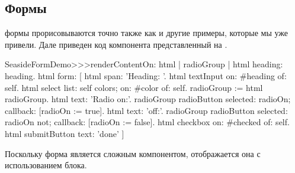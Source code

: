 \documentclass[a4paper,10pt,twoside]{book}
\begin{document}
\subsection{Формы}


формы прорисовываются точно также как и другие примеры,
которые мы уже привели.
Дале приведен код компонента  представленный на
.

\begin{code}{}
SeasideFormDemo>>>renderContentOn: html
	| radioGroup |
	html heading: heading.
	html form: [
		html span: 'Heading: '.
		html textInput on: #heading of: self.
		html select
			list: self colors;
			on: #color of: self.
		radioGroup := html radioGroup.
		html text: 'Radio on:'.
		radioGroup radioButton
			selected: radioOn;
			callback: [radioOn := true].
		html text: 'off:'.
		radioGroup radioButton
			selected: radioOn not;
			callback: [radioOn := false].
		html checkbox on: #checked of: self.
		html submitButton
			text: 'done' ]
\end{code}{}


Поскольку форма является сложным компонентом, отображается она с использованием блока.

\end{document}

